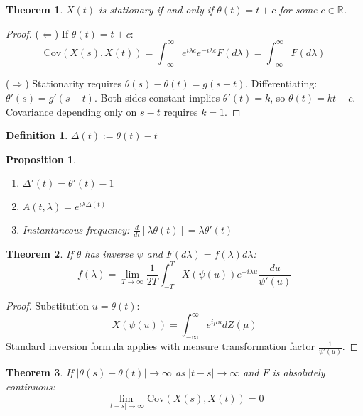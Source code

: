 \documentclass[11pt]{article}
\newtheorem{theorem}{Theorem}
\newtheorem{proposition}{Proposition}
\newtheorem{definition}{Definition}
\begin{document}
\begin{theorem}
$X(t)$ is stationary if and only if $\theta(t) = t + c$ for some $c \in \mathbb{R}$.
\end{theorem}

\begin{proof}
($\Leftarrow$) If $\theta(t) = t + c$:
\begin{equation}
\text{Cov}(X(s),X(t)) = \int_{-\infty}^{\infty} e^{i\lambda c} e^{-i\lambda c} F(d\lambda) = \int_{-\infty}^{\infty} F(d\lambda)
\end{equation}

($\Rightarrow$) Stationarity requires $\theta(s) - \theta(t) = g(s-t)$. Differentiating: $\theta'(s) = g'(s-t)$. Both sides constant implies $\theta'(t) = k$, so $\theta(t) = kt + c$. Covariance depending only on $s-t$ requires $k = 1$.
\end{proof}

\begin{definition}
$\Delta(t) := \theta(t) - t$
\end{definition}

\begin{proposition}
\begin{enumerate}
\item $\Delta'(t) = \theta'(t) - 1$
\item $A(t,\lambda) = e^{i\lambda\Delta(t)}$
\item Instantaneous frequency: $\frac{d}{dt}[\lambda\theta(t)] = \lambda\theta'(t)$
\end{enumerate}
\end{proposition}

\begin{theorem}
If $\theta$ has inverse $\psi$ and $F(d\lambda) = f(\lambda)d\lambda$:
\begin{equation}
f(\lambda) = \lim_{T \to \infty} \frac{1}{2T} \int_{-T}^T X(\psi(u)) e^{-i\lambda u} \frac{du}{\psi'(u)}
\end{equation}
\end{theorem}

\begin{proof}
Substitution $u = \theta(t)$:
\begin{equation}
X(\psi(u)) = \int_{-\infty}^{\infty} e^{i\mu u} dZ(\mu)
\end{equation}
Standard inversion formula applies with measure transformation factor $\frac{1}{\psi'(u)}$.
\end{proof}

\begin{theorem}
If $|\theta(s) - \theta(t)| \to \infty$ as $|t-s| \to \infty$ and $F$ is absolutely continuous:
\begin{equation}
\lim_{|t-s| \to \infty} \text{Cov}(X(s),X(t)) = 0
\end{equation}
\end{theorem}
\end{document}
